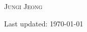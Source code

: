 \documentclass[10pt,letterpaper]{article}
\def\name{\textsc{Jungi Jeong}}
\begin{document}
{\Huge \name}


\vspace{0.15in}



%





%

%
%
%
%


% 


\begin{center}
  \begin{small}
    Last updated: \today
  \end{small}
\end{center}
\end{document}
